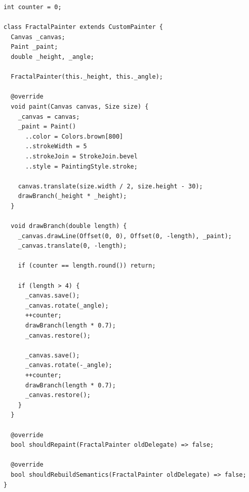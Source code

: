 \documentclass{resonance}
\begin{document}
\begin{verbatim}
int counter = 0;

class FractalPainter extends CustomPainter {
  Canvas _canvas;
  Paint _paint;
  double _height, _angle;

  FractalPainter(this._height, this._angle);

  @override
  void paint(Canvas canvas, Size size) {
    _canvas = canvas;
    _paint = Paint()
      ..color = Colors.brown[800]
      ..strokeWidth = 5
      ..strokeJoin = StrokeJoin.bevel
      ..style = PaintingStyle.stroke;

    canvas.translate(size.width / 2, size.height - 30);
    drawBranch(_height * _height);
  }

  void drawBranch(double length) {
    _canvas.drawLine(Offset(0, 0), Offset(0, -length), _paint);
    _canvas.translate(0, -length);

    if (counter == length.round()) return;

    if (length > 4) {
      _canvas.save();
      _canvas.rotate(_angle);
      ++counter;
      drawBranch(length * 0.7);
      _canvas.restore();

      _canvas.save();
      _canvas.rotate(-_angle);
      ++counter;
      drawBranch(length * 0.7);
      _canvas.restore();
    }
  }

  @override
  bool shouldRepaint(FractalPainter oldDelegate) => false;

  @override
  bool shouldRebuildSemantics(FractalPainter oldDelegate) => false;
}
\end{verbatim}
\end{document}
